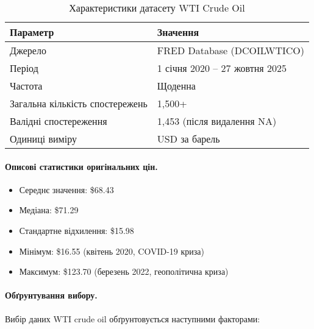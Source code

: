 \documentclass[12pt,a4paper]{article}
\begin{document}
\begin{table}[h]
\centering
\caption{Характеристики датасету WTI Crude Oil}
\label{tab:wti_characteristics}
\begin{tabular}{ll}
\toprule
\textbf{Параметр} & \textbf{Значення} \\
\midrule
Джерело & FRED Database (DCOILWTICO) \\
Період & 1 січня 2020 -- 27 жовтня 2025 \\
Частота & Щоденна \\
Загальна кількість спостережень & 1,500+ \\
Валідні спостереження & 1,453 (після видалення NA) \\
Одиниці виміру & USD за барель \\
\bottomrule
\end{tabular}
\end{table}

\paragraph{Описові статистики оригінальних цін.}
\begin{itemize}
    \item Середнє значення: \$68.43
    \item Медіана: \$71.29
    \item Стандартне відхилення: \$15.98
    \item Мінімум: \$16.55 (квітень 2020, COVID-19 криза)
    \item Максимум: \$123.70 (березень 2022, геополітична криза)
\end{itemize}

\paragraph{Обґрунтування вибору.}
Вибір даних WTI crude oil обґрунтовується наступними факторами:
\end{document}
